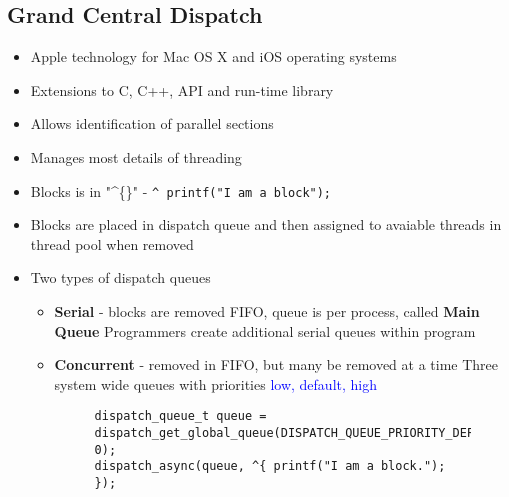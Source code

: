\documentclass{book}
\begin{document}
            \subsection{Grand Central Dispatch}
                \begin{itemize}
                    \item Apple technology for Mac OS X and iOS operating systems
                    \item Extensions to C, C++, API and run-time library
                    \item Allows identification of parallel sections
                    \item Manages most details of threading
                    \item Blocks is in "\textasciicircum\{\}" - \texttt{^{ printf("I am a block"); }}
                    \item Blocks are placed in dispatch queue and then assigned to avaiable threads in thread pool when removed
                    \item Two types of dispatch queues
                        \begin{itemize}
                            \item \textbf{Serial} - blocks are removed FIFO, queue is per process, called \textbf{Main Queue}
                                \subitem Programmers create additional serial queues within program
                            \item \textbf{Concurrent} - removed in FIFO, but many be removed at a time
                                \subitem Three system wide queues with priorities \textcolor{blue}{low, default, high}
                                \begin{figure}[H]
                                    \begin{flushleft}
                                        \begin{verbatim}
dispatch_queue_t queue = dispatch_get_global_queue(DISPATCH_QUEUE_PRIORITY_DEFAULT, 0);
dispatch_async(queue, ^{ printf("I am a block."); });
                                        \end{verbatim}
                                    \end{flushleft}
                                \end{figure}
                        \end{itemize}
                \end{itemize}
\end{document}
